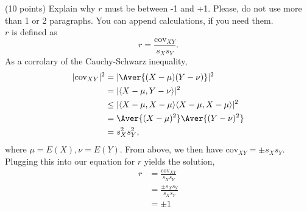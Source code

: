 \documentclass[onecolumn,10pt]{jhwhw}
\begin{document}
\clearpage
\problem{}
(10 points) Explain why $r$ must be between -1 and +1. Please, do not use more than 1 or 2 paragraphs. You can append calculations, if you need them.\\

$r$ is defined as
$$r = \frac{\mbox{cov}_{XY}}{s_X s_Y}.$$
As a corrolary of the Cauchy-Schwarz inequality,
\begin{align*}
|\mbox{cov}_{XY}|^2 & =  |\Aver{(X-\mu)(Y-\nu)}|^2           \\
                    & =  |\langle X-\mu,Y-\nu \rangle|^2               \\
                    & \leq  |\langle X-\mu,X-\mu \rangle\langle X-\mu,X-\mu \rangle|^2  \\
                    & =  \Aver{(X-\mu)^2}\Aver{(Y-\nu)^2}        \\
                    & =  s_X^2 s_Y^2,
\end{align*}
where $\mu=E(X), \nu=E(Y)$. From above, we then have $\mbox{cov}_{XY} = \pm s_X s_Y$. Plugging this into our equation for $r$ yields the solution,
\begin{align*}
r &= \frac{\mbox{cov}_{XY}}{s_X s_Y} \\
  &= \frac{\pm s_X s_Y}{s_X s_Y} \\
  &= \pm 1
\end{align*}
\end{document}

